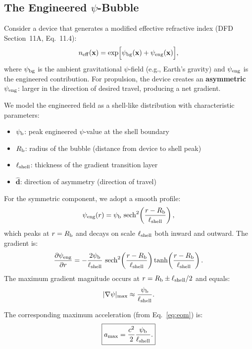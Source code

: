 \documentclass[12pt,aps,prd,superscriptaddress,nofootinbib]{revtex4-2}
\newcommand{\neff}{n_{\rm eff}}
\newcommand{\psib}{\psi_{\rm b}}
\newcommand{\Rb}{R_{\rm b}}
\newcommand{\Lshell}{\ell_{\rm shell}}
\begin{document}
\subsection{The Engineered $\psi$-Bubble}

Consider a device that generates a modified effective refractive index
(DFD Section~11A, Eq.~11.4):
\begin{equation}
\neff(\mathbf{x}) = \exp\!\Big[\psi_{\rm bg}(\mathbf{x})
  + \psi_{\rm eng}(\mathbf{x})\Big],
\label{eq:neff}
\end{equation}
where $\psi_{\rm bg}$ is the ambient gravitational $\psi$-field
(e.g., Earth's gravity) and $\psi_{\rm eng}$ is the engineered
contribution. For propulsion, the device creates an
\textbf{asymmetric} $\psi_{\rm eng}$: larger in the direction of
desired travel, producing a net gradient.

We model the engineered field as a shell-like distribution with
characteristic parameters:
\begin{itemize}
\item $\psib$: peak engineered $\psi$-value at the shell boundary
\item $\Rb$: radius of the bubble (distance from device to shell peak)
\item $\Lshell$: thickness of the gradient transition layer
\item $\hat{\mathbf{d}}$: direction of asymmetry (direction of travel)
\end{itemize}

For the symmetric component, we adopt a smooth profile:
\begin{equation}
\psi_{\rm eng}(r) = \psib\,\operatorname{sech}^2\!\left(
  \frac{r - \Rb}{\Lshell}\right),
\label{eq:psi-profile}
\end{equation}
which peaks at $r = \Rb$ and decays on scale $\Lshell$ both inward
and outward. The gradient is:
\begin{equation}
\frac{\partial\psi_{\rm eng}}{\partial r} =
-\frac{2\psib}{\Lshell}\,\operatorname{sech}^2\!\left(
  \frac{r - \Rb}{\Lshell}\right)
\tanh\!\left(\frac{r - \Rb}{\Lshell}\right).
\label{eq:psi-gradient}
\end{equation}
The maximum gradient magnitude occurs at $r = \Rb \pm \Lshell/2$
and equals:
\begin{equation}
|\nabla\psi|_{\rm max} \approx \frac{\psib}{\Lshell}.
\label{eq:grad-max}
\end{equation}

The corresponding maximum acceleration (from Eq.~\ref{eq:eom}) is:
\begin{equation}
\boxed{a_{\rm max} = \frac{c^2}{2}\frac{\psib}{\Lshell}.}
\label{eq:a-max}
\end{equation}
\end{document}
